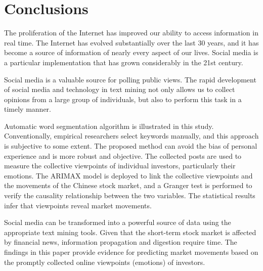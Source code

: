 \documentclass[review,3p,times,12pt,number]{elsarticle}
\begin{document}
\section{Conclusions}
\label{sec:weibo:conclude}
The proliferation of the Internet has improved our ability to access information in real time. The Internet has evolved substantially over the last 30 years, and it has become a source of information of nearly every aspect of our lives. Social media is a particular implementation that has grown considerably in the 21st century.

Social media is a valuable source for polling public views. The rapid development of social media and technology in text mining not only allows us to collect opinions from a large group of individuals, but also to perform this task in a timely manner.

Automatic word segmentation algorithm is illustrated in this study. Conventionally, empirical researchers select keywords manually, and this approach is subjective to some extent. The proposed method can avoid the bias of personal experience and is more robust and objective. The collected posts are used to measure the collective viewpoints of individual investors, particularly their emotions. The ARIMAX model is deployed to link the collective viewpoints and the movements of the Chinese stock market, and a Granger test is performed to verify the causality relationship between the two variables. The statistical results infer that viewpoints reveal market movements.

Social media can be transformed into a powerful source of data using the appropriate text mining tools. Given that the short-term stock market is affected by financial news, information propagation and digestion require time. The findings in this paper provide evidence for predicting market movements based on the promptly collected online viewpoints (emotions) of investors.


%




\end{document}
